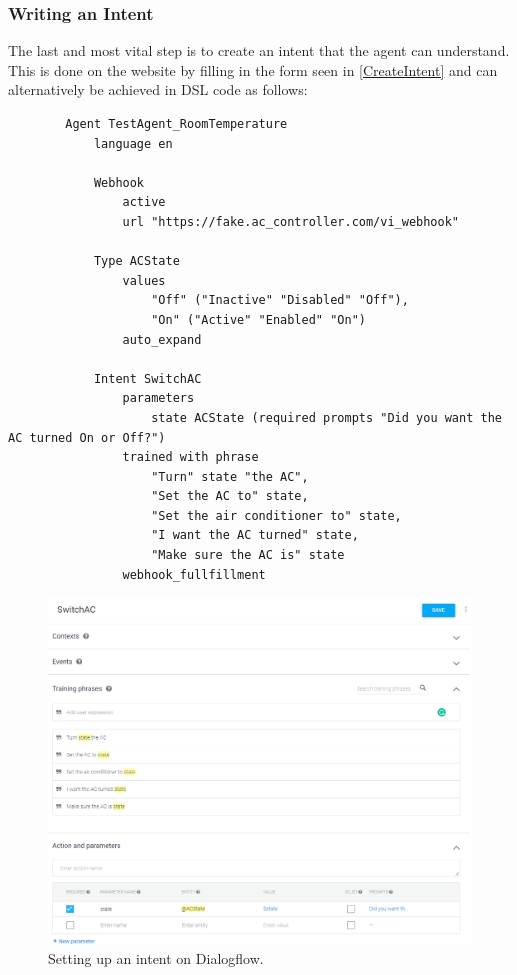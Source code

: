 \subsubsection{Writing an Intent}
The last and most vital step is to create an intent that the agent can understand. This is done on the website by filling in the form seen in \autoref{CreateIntent} and can alternatively be achieved in DSL code as follows:
\begin{samepage}
    \begin{verbatim}
        Agent TestAgent_RoomTemperature
            language en 
                
            Webhook 
                active 
                url "https://fake.ac_controller.com/vi_webhook"

            Type ACState
                values 
                    "Off" ("Inactive" "Disabled" "Off"),
                    "On" ("Active" "Enabled" "On")
                auto_expand

            Intent SwitchAC
                parameters
                    state ACState (required prompts "Did you want the AC turned On or Off?")
                trained with phrase
                    "Turn" state "the AC",
                    "Set the AC to" state,
                    "Set the air conditioner to" state,
                    "I want the AC turned" state,
                    "Make sure the AC is" state
                webhook_fullfillment
    \end{verbatim}
\end{samepage}

\begin{figure}[ht]
    \centering
    \includegraphics[width=1\textwidth]{Thesis_Images/CreateIntent.PNG}
    \caption{Setting up an intent on Dialogflow.}
        \label{CreateIntent}
\end{figure}

